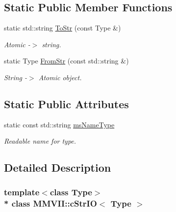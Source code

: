 \subsection*{Static Public Member Functions}
\begin{DoxyCompactItemize}
\item 
static std\+::string \hyperlink{classMMVII_1_1cStrIO_a7c97ae9c5a00f60abaa85e14502f0e75}{To\+Str} (const Type \&)\hypertarget{classMMVII_1_1cStrIO_a7c97ae9c5a00f60abaa85e14502f0e75}{}\label{classMMVII_1_1cStrIO_a7c97ae9c5a00f60abaa85e14502f0e75}

\begin{DoxyCompactList}\small\item\em Atomic -\/$>$ string. \end{DoxyCompactList}\item 
static Type \hyperlink{classMMVII_1_1cStrIO_a72abe4284fce635f36559f6ffd8afc2a}{From\+Str} (const std\+::string \&)\hypertarget{classMMVII_1_1cStrIO_a72abe4284fce635f36559f6ffd8afc2a}{}\label{classMMVII_1_1cStrIO_a72abe4284fce635f36559f6ffd8afc2a}

\begin{DoxyCompactList}\small\item\em String -\/$>$ Atomic object. \end{DoxyCompactList}\end{DoxyCompactItemize}
\subsection*{Static Public Attributes}
\begin{DoxyCompactItemize}
\item 
static const std\+::string \hyperlink{classMMVII_1_1cStrIO_a4c7f9c21193c6266cf01a3d35772a6f4}{ms\+Name\+Type}\hypertarget{classMMVII_1_1cStrIO_a4c7f9c21193c6266cf01a3d35772a6f4}{}\label{classMMVII_1_1cStrIO_a4c7f9c21193c6266cf01a3d35772a6f4}

\begin{DoxyCompactList}\small\item\em Readable name for type. \end{DoxyCompactList}\end{DoxyCompactItemize}


\subsection{Detailed Description}
\subsubsection*{template$<$class Type$>$\\*
class M\+M\+V\+I\+I\+::c\+Str\+I\+O$<$ Type $>$}

